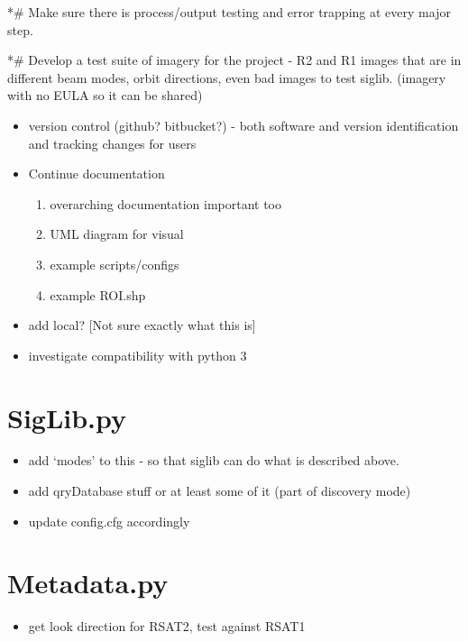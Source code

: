 \documentclass[letterpaper,10pt,openany,oneside]{sphinxmanual}
\begin{document}
*\# Make sure there is process/output testing and error trapping at
every major step.

*\# Develop a test suite of imagery for the project - R2 and R1 images
that are in different beam modes, orbit directions, even bad images to
test siglib. (imagery with no EULA so it can be shared)
\begin{itemize}
\item {} 
version control (github? bitbucket?) - both software and version
identification and tracking changes for users

\item {} 
Continue documentation
\begin{enumerate}
\item {} 
overarching documentation important too

\item {} 
UML diagram for visual

\item {} 
example scripts/configs

\item {} 
example ROI.shp

\end{enumerate}

\item {} 
add local? {[}Not sure exactly what this is{]}

\item {} 
investigate compatibility with python 3

\end{itemize}


\section{SigLib.py}
\label{project:siglib-py}\begin{itemize}
\item {} 
add `modes' to this - so that siglib can do what is described above.

\item {} 
add qryDatabase stuff or at least some of it (part of discovery mode)

\item {} 
update config.cfg accordingly

\end{itemize}


\section{Metadata.py}
\label{project:metadata-py}\begin{itemize}
\item {} 
get look direction for RSAT2, test against RSAT1

\end{itemize}
\end{document}
